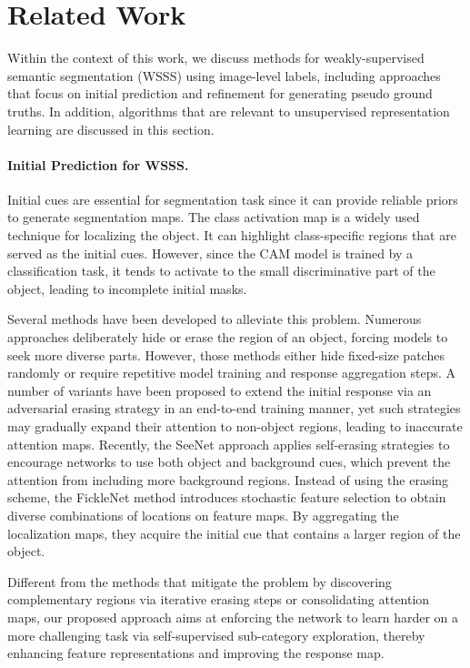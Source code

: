 \documentclass[10pt,twocolumn,letterpaper]{article}
\begin{document}
\section{Related Work}
Within the context of this work, we discuss methods for weakly-supervised semantic segmentation (WSSS) using image-level labels, including approaches that focus on initial prediction and refinement for generating pseudo ground truths. In addition, algorithms that are relevant to unsupervised representation learning are discussed in this section.


\paragraph{Initial Prediction for WSSS.}


Initial cues are essential for segmentation task since it can provide reliable priors to generate segmentation maps. The class activation map  \cite{zhou2016learning} is a widely used technique for localizing the object. It can highlight class-specific regions that are served as the initial cues. However, since the CAM model is trained by a classification task, it tends to activate to the small discriminative part of the object, leading to incomplete initial masks.

Several methods have been developed to alleviate this problem. Numerous approaches \cite{singh2017hide, wei2017object} deliberately hide or erase the region of an object, forcing models to seek more diverse parts. 
However, those methods either hide fixed-size patches randomly or require repetitive model training and response aggregation steps. 
A number of variants \cite{zhang2018adversarial, li2018tell} have been proposed to extend the initial response via an adversarial erasing strategy in an end-to-end training manner, yet such strategies may gradually expand their attention to non-object regions, leading to inaccurate attention maps. 
Recently, the SeeNet approach \cite{hou2018self} applies self-erasing strategies to encourage networks to use both object and background cues, which prevent the attention from including more background regions. 
Instead of using the erasing scheme, the FickleNet method \cite{lee2019ficklenet} introduces stochastic feature selection to obtain diverse combinations of locations on feature maps. By aggregating the localization maps, they acquire the initial cue that contains a larger region of the object. 

Different from the methods that mitigate the problem by discovering complementary regions via iterative erasing steps or consolidating attention maps, our proposed approach aims at enforcing the network to learn harder on a more challenging task via self-supervised sub-category exploration, thereby enhancing feature representations and improving the response map.
\end{document}

